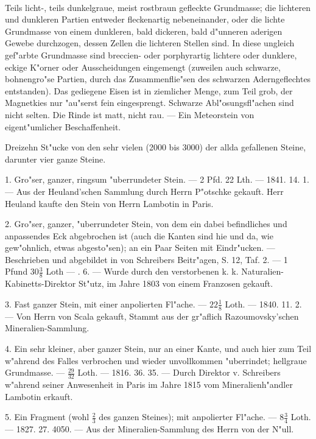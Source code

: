 \documentclass[a4paper, 11pt, oneside, polutonikogreek, german]{article}
\begin{document}
\paragraph{}
Teils licht-, teils dunkelgraue, meist rostbraun gefleckte Grundmasse; die lichteren und dunkleren Partien entweder fleckenartig nebeneinander, oder die lichte Grundmasse von einem dunkleren, bald dickeren, bald d"unneren aderigen Gewebe durchzogen, dessen Zellen die lichteren Stellen sind. In diese ungleich gef"arbte Grundmasse sind breccien- oder porphyrartig lichtere oder dunklere, eckige K"orner oder Ausscheidungen eingemengt (zuweilen auch schwarze, bohnengro"se Partien, durch das Zusammenflie"sen des schwarzen Aderngeflechtes entstanden). Das gediegene Eisen ist in ziemlicher Menge, zum Teil grob, der Magnetkies nur "au"serst fein eingesprengt. Schwarze Abl"osungsfl"achen sind nicht selten. Die Rinde ist matt, nicht rau. --- Ein Meteorstein von eigent"umlicher Beschaffenheit.

Dreizehn St"ucke von den sehr vielen (2000 bis 3000) der allda gefallenen Steine, darunter vier ganze Steine.

1. Gro"ser, ganzer, ringsum "uberrundeter Stein. --- 2 Pfd. 22 Lth. --- 1841. 14. 1. --- Aus der Heuland'schen Sammlung durch Herrn P"otschke gekauft. Herr Heuland kaufte den Stein von Herrn Lambotin in Paris.

2. Gro"ser, ganzer, "uberrundeter Stein, von dem ein dabei befindliches und anpassendes Eck abgebrochen ist (auch die Kanten sind hie und da, wie gew"ohnlich, etwas abgesto"sen); an ein Paar Seiten mit Eindr"ucken. --- Beschrieben und abgebildet in von Schreibers Beitr"agen, S. 12, Taf. 2. --- 1 Pfund $\mathfrak{30\frac{3}{8}}$ Loth --- . 6. --- Wurde durch den verstorbenen k. k. Naturalien-Kabinetts-Direktor St"utz, im Jahre 1803 von einem Franzosen gekauft.

3. Fast ganzer Stein, mit einer anpolierten Fl"ache. --- $\mathfrak{22\frac{1}{8}}$ Loth. --- 1840. 11. 2. --- Von Herrn von Scala gekauft, Stammt aus der gr"aflich Razoumovsky'schen Mineralien-Sammlung.

4. Ein sehr kleiner, aber ganzer Stein, nur an einer Kante, und auch hier zum Teil w"ahrend des Falles verbrochen und wieder unvollkommen "uberrindet; hellgraue Grundmasse. --- $\mathfrak{\frac{29}{32}}$ Loth. --- 1816. 36. 35. --- Durch Direktor v. Schreibers w"ahrend seiner Anwesenheit in Paris im Jahre 1815 vom Mineralienh"andler Lambotin erkauft.

5. Ein Fragment (wohl $\mathfrak{\frac{2}{3}}$ des ganzen Steines); mit anpolierter Fl"ache. --- $\mathfrak{8\frac{3}{4}}$ Loth. --- 1827. 27. 4050. --- Aus der Mineralien-Sammlung des Herrn von der N"ull.
\end{document}
